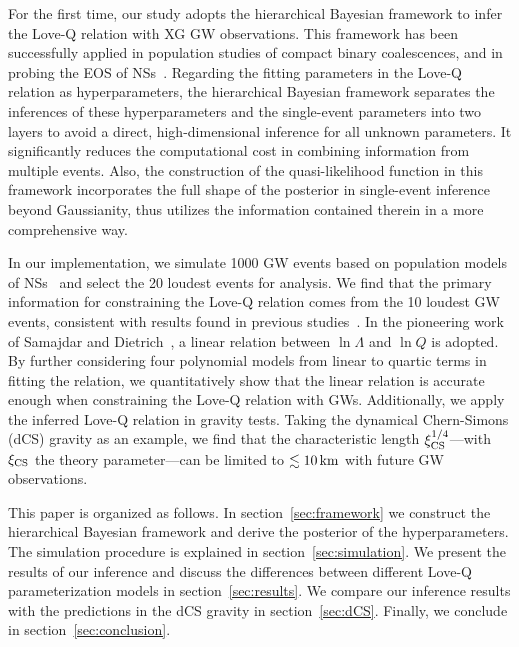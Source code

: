 \documentclass[a4paper,11pt]{article}
\begin{document}
For the first time, our study adopts the hierarchical Bayesian framework to
infer the Love-Q relation with XG GW observations.  This framework has been
successfully applied in population studies of compact binary coalescences, and
in probing the EOS of NSs~\cite{Mandel:2009nx, Mandel:2009pc, Adams:2012qw,
Lackey:2014fwa, Mandel:2018mve, Golomb:2021tll, KAGRA:2021duu, Wang:2024xon}. 
Regarding the fitting parameters in the Love-Q relation as hyperparameters, the
hierarchical Bayesian framework separates the inferences of these
hyperparameters and the single-event parameters into two layers to avoid a
direct, high-dimensional inference for all unknown parameters. It significantly
reduces the computational cost in combining information from multiple events.
Also, the construction of the quasi-likelihood function in this framework
incorporates the full shape of the posterior in single-event inference beyond
Gaussianity, thus utilizes the information contained therein in a more
comprehensive way.  

In our implementation, we simulate 1000 GW events based on population models of
NSs~\cite{Fishbach:2018edt, Farrow:2019xnc, Samajdar:2020xrd} and select the 20
loudest events for analysis.  We find that the primary information for
constraining the Love-Q relation comes from the 10 loudest GW events, consistent
with results found in previous studies~\cite{Lackey:2014fwa}. In the pioneering
work of Samajdar and Dietrich~\cite{Samajdar:2020xrd}, a linear relation between
$\ln\Lambda$ and $\ln Q$ is adopted. By further considering four polynomial
models from linear to quartic terms in fitting the relation, we quantitatively
show that the linear relation is accurate enough when constraining the Love-Q
relation with GWs.  Additionally, we apply the inferred Love-Q relation in
gravity tests.  Taking the dynamical Chern-Simons (dCS) gravity as an example,
we find that the characteristic length $\xi_{\rm CS}^{1/4}$---with $\xi_{\rm
CS}$ the theory parameter---can be limited to $\lesssim 10\,{\rm km}$ with
future GW observations. 

This paper is organized as follows. In section~\ref{sec:framework} we construct 
the hierarchical Bayesian framework and derive the posterior of the
hyperparameters.  The simulation procedure is explained in
section~\ref{sec:simulation}.  We present the results of our inference and
discuss the differences between different Love-Q parameterization models in
section~\ref{sec:results}.  We compare our inference results with the
predictions in the dCS gravity in section~\ref{sec:dCS}. Finally, we conclude in
section~\ref{sec:conclusion}.
\end{document}
